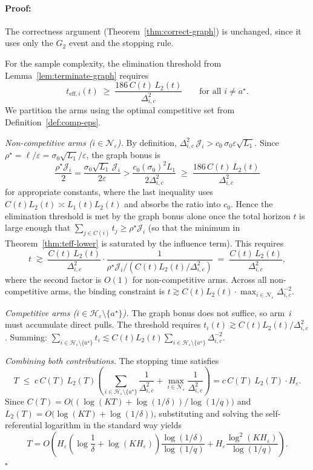 \documentclass{article}
\newenvironment{proof}{\paragraph{Proof:}}{\hfill$\square$}
\begin{document}
\begin{proof}
The correctness argument (Theorem~\ref{thm:correct-graph}) is unchanged, since
it uses only the $G_2$ event and the stopping rule.

For the sample complexity, the elimination threshold from
Lemma~\ref{lem:terminate-graph} requires
\[
t_{\mathrm{eff},i}(t)
\;\ge\;
\frac{186\,C(t)\,L_2(t)}{\Delta_{i,c}^2}
\qquad\text{for all }i\neq a^\star.
\]
We partition the arms using the optimal competitive set from
Definition~\ref{def:comp-eps}.

\smallskip\noindent
\emph{Non-competitive arms ($i\in\mathcal N_\varepsilon$).}
By definition, $\Delta_{i,c}^2\,\mathcal J_i>c_0\,\sigma_0\varepsilon\sqrt{L_1}$.
Since $\rho^\star=\ell/\varepsilon=\sigma_0\sqrt{L_1}/\varepsilon$, the graph
bonus is
\[
\frac{\rho^\star\mathcal J_i}{2}
=
\frac{\sigma_0\sqrt{L_1}\,\mathcal J_i}{2\varepsilon}
>
\frac{c_0(\sigma_0)^2 L_1}{2\Delta_{i,c}^2}
\;\ge\;
\frac{186\,C(t)\,L_2(t)}{\Delta_{i,c}^2}
\]
for appropriate constants, where the last inequality uses
$C(t)L_2(t)\asymp L_1(t)L_2(t)$ and absorbs the ratio into $c_0$.
Hence the elimination threshold is met by the graph bonus alone once the total
horizon $t$ is large enough that $\sum_{j\in C(i)}t_j\ge\rho^\star\mathcal J_i$
(so that the minimum in Theorem~\ref{thm:teff-lower} is saturated by the
influence term). This requires
\[
t
\;\gtrsim\;
\frac{C(t)\,L_2(t)}{\Delta_{i,c}^2}
\cdot
\frac{1}{\rho^\star\mathcal J_i/(C(t)L_2(t)/\Delta_{i,c}^2)}
\;=\;
\frac{C(t)\,L_2(t)}{\Delta_{i,c}^2},
\]
where the second factor is $O(1)$ for non-competitive arms. Across all
non-competitive arms, the binding constraint is
$t\gtrsim C(t)L_2(t)\cdot\max_{i\in\mathcal N_\varepsilon}\Delta_{i,c}^{-2}$.

\smallskip\noindent
\emph{Competitive arms ($i\in\mathcal H_\varepsilon\setminus\{a^\star\}$).}
The graph bonus does not suffice, so arm~$i$ must accumulate direct pulls.
The threshold requires
$t_i(t)\gtrsim C(t)L_2(t)/\Delta_{i,c}^2$.
Summing:
$\sum_{i\in\mathcal H_\varepsilon\setminus\{a^\star\}}t_i
\lesssim
C(t)L_2(t)\sum_{i\in\mathcal H_\varepsilon\setminus\{a^\star\}}\Delta_{i,c}^{-2}$.

\smallskip\noindent
\emph{Combining both contributions.}
The stopping time satisfies
\[
T
\;\le\;
c\,C(T)\,L_2(T)
\left(
\sum_{i\in\mathcal H_\varepsilon\setminus\{a^\star\}}\frac{1}{\Delta_{i,c}^2}
+
\max_{i\in\mathcal N_\varepsilon}\frac{1}{\Delta_{i,c}^2}
\right)
=
c\,C(T)\,L_2(T)\cdot H_\varepsilon.
\]
Since
$C(T)=O\bigl((\log(KT)+\log(1/\delta))/\log(1/q)\bigr)$ and
$L_2(T)=O\bigl(\log(KT)+\log(1/\delta)\bigr)$,
substituting and solving the self-referential logarithm in the standard way
yields
\[
T
=
O\!\left(
H_\varepsilon
\left(\log\frac1\delta+\log(KH_\varepsilon)\right)
\frac{\log(1/\delta)}{\log(1/q)}
+
H_\varepsilon
\frac{\log^2(KH_\varepsilon)}{\log(1/q)}
\right).
\]
\end{proof}
\end{document}
